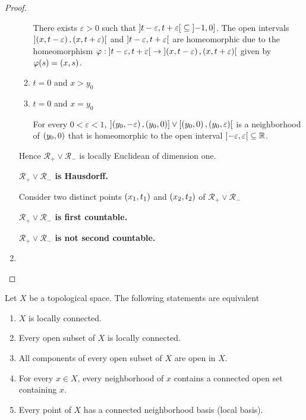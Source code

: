 \begin{proof}
\begin{enumerate}[label={(\alph*)}]
\begin{enumerate}[label={\textbf{Case \arabic*.}},itemindent=1cm]
			            There exists $\varepsilon > 0$ such that $\left]{t - \varepsilon, t + \varepsilon}\right[ \subseteq \left]{-1, 0}\right]$. The open intervals $\left]{\left({x, t - \varepsilon}\right), \left({x, t + \varepsilon}\right)}\right[$ and $\left]{t - \varepsilon, t + \varepsilon}\right[$ are homeomorphic due to the homeomorphism $\varphi: \left]{t - \varepsilon, t + \varepsilon}\right[ \to \left]{\left({x, t - \varepsilon}\right), \left({x, t + \varepsilon}\right)}\right[$ given by $\varphi(s) = \left({x, s}\right)$.
			      \item $t = 0$ and $x > y_{0}$
			      \item $t = 0$ and $x = y_{0}$

			            For every $0 < \varepsilon < 1$, $\left]{\left({y_{0}, -\varepsilon}\right), \left({y_{0}, 0}\right)}\right] \vee \left[{\left({y_{0}, 0}\right), \left({y_{0}, \varepsilon}\right)}\right[$ is a neighborhood of $\left({y_{0}, 0}\right)$ that is homeomorphic to the open interval $\left]{-\varepsilon, \varepsilon}\right[ \subseteq \mathbb{R}$.
		      \end{enumerate}

		      Hence $\mathscr{R}_{+} \vee \mathscr{R}_{-}$ is locally Euclidean of dimension one.

		      \textbf{$\mathscr{R}_{+} \vee \mathscr{R}_{-}$ is Hausdorff.}

		      Consider two distinct points $\left({x_{1}, t_{1}}\right)$ and $\left({x_{2}, t_{2}}\right)$ of $\mathscr{R}_{+} \vee \mathscr{R}_{-}$

		      \textbf{$\mathscr{R}_{+} \vee \mathscr{R}_{-}$ is first countable.}

		      \textbf{$\mathscr{R}_{+} \vee \mathscr{R}_{-}$ is not second countable.}
		\item %
	\end{enumerate}
\end{proof}

\begin{note}\label{note:characterizations-of-local-connectedness}
	Let $X$ be a topological space. The following statements are equivalent
	\begin{enumerate}[label={(\alph*)}]
		\item $X$ is locally connected.
		\item Every open subset of $X$ is locally connected.
		\item All components of every open subset of $X$ are open in $X$.
		\item For every $x\in X$, every neighborhood of $x$ contains a connected open set containing $x$.
		\item Every point of $X$ has a connected neighborhood basis (local basis).
	\end{enumerate}
\end{note}

